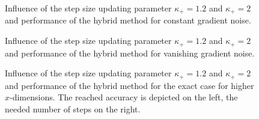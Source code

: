 \vspace{-1.5em}

\begin{figure}[H]
	\begin{subfigure}{0.49\textwidth}
	\end{subfigure}
	\begin{subfigure}{0.49\textwidth}
	\end{subfigure}
	\caption{Influence of the step size updating parameter \(\kappa_+ = 1.2\) and \(\kappa_+ =2 \) and performance of the hybrid method for constant gradient noise.}%
	\label{fig_const_grad_noise_comp}%
\end{figure}

\vspace{-1.5em}

\begin{figure}[H]
	\begin{subfigure}{0.49\textwidth}
	\end{subfigure}
	\begin{subfigure}{0.49\textwidth}
	\end{subfigure}
	\caption{Influence of the step size updating parameter \(\kappa_+ = 1.2\) and \(\kappa_+ =2 \) and performance of the hybrid method for vanishing gradient noise.}%
	\label{fig_van_grad_noise_comp}%
\end{figure}

\vspace{-1.5em}


\begin{figure}[H]%
	\begin{subfigure}{0.49\textwidth}
	\end{subfigure}
	\begin{subfigure}{0.49\textwidth}
	\end{subfigure}
	\label{fig_no_noise_comp_large}
	\caption{Influence of the step size updating parameter \(\kappa_+ = 1.2\) and \(\kappa_+ =2 \) and performance of the hybrid method for the exact case for higher \(x\)-dimensions. The reached accuracy is depicted on the left, the needed number of steps on the right.}
\end{figure}

